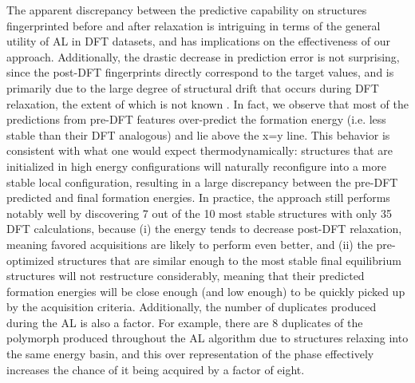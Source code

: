 %
%
The apparent discrepancy between the predictive capability on structures fingerprinted before and after relaxation is intriguing in terms of the general utility of AL in DFT datasets,
and has implications on the effectiveness of our approach.
%
Additionally, the drastic decrease in prediction error is not surprising,
since the post-DFT fingerprints directly correspond to the target \DHf values,
and is primarily due to the large degree of structural drift that occurs during DFT relaxation,
the extent of which is not known .
%
In fact, we observe that most of the predictions from pre-DFT features over-predict the formation energy (i.e. less stable than their DFT analogous) and lie above the x=y line.
%
This behavior is consistent with what one would expect thermodynamically:
structures that are initialized in high energy configurations will  naturally reconfigure into a more stable local configuration,
resulting in a large discrepancy between the pre-DFT predicted and final formation energies.
%
In practice, the approach still performs notably well by discovering 7 out of the 10 most stable structures with only 35 DFT calculations, because (i) the energy tends to decrease post-DFT relaxation,
meaning favored acquisitions are likely to perform even better,
and (ii) the pre-optimized structures that are similar enough to the most stable final equilibrium structures will not restructure considerably,
meaning that their predicted formation energies will be close enough (and low enough) to be quickly picked up by the acquisition criteria.
%
Additionally, the number of duplicates produced during the AL is also a factor.
%
For example, there are \num{8} duplicates of the \aIrOthree polymorph produced throughout the AL algorithm due to structures relaxing into the same energy basin,
and this over representation of the \aIrOthree phase effectively increases the chance of it being acquired by a factor of eight.







